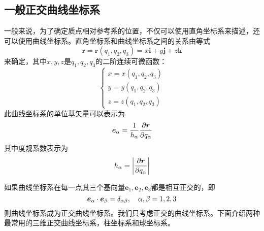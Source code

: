 \subsection{一般正交曲线坐标系}

一般来说，为了确定质点相对参考系的位置，不仅可以使用直角坐标系来描述，还可以使用曲线坐标系。直角坐标系和曲线坐标系之间的关系由等式
\begin{equation}
	\boldsymbol{r} = \boldsymbol{r}(q_1,q_2,q_3) = x\boldsymbol{i} + y\boldsymbol{j} + z\boldsymbol{k}
\end{equation}
来确定，其中$x,y,z$是$q_1,q_2,q_3$的二阶连续可微函数：
\begin{equation}
\begin{cases}
	x = x(q_1,q_2,q_3) \\
	y = y(q_1,q_2,q_3) \\
	z = z(q_1,q_2,q_3)
\end{cases}
\end{equation}
此曲线坐标系的单位基矢量可以表示为
\begin{equation}
	\boldsymbol{e}_\alpha = \dfrac{1}{h_\alpha} \dfrac{\partial \boldsymbol{r}}{\partial q_\alpha}
\end{equation}
其中度规系数表示为
\begin{equation}
	h_\alpha = \left|\dfrac{\partial \boldsymbol{r}}{\partial q_\alpha}\right|
\end{equation}

如果曲线坐标系在每一点其三个基向量$\boldsymbol{e}_1, \boldsymbol{e}_2, \boldsymbol{e}_3$都是相互正交的，即
\begin{equation}
	\boldsymbol{e}_\alpha \cdot \boldsymbol{e}_\beta = \delta_{\alpha\beta}, \quad \alpha,\beta = 1,2,3
\end{equation}
则曲线坐标系成为正交曲线坐标系。我们只考虑正交的曲线坐标系。下面介绍两种最常用的三维正交曲线坐标系，柱坐标系和球坐标系。

